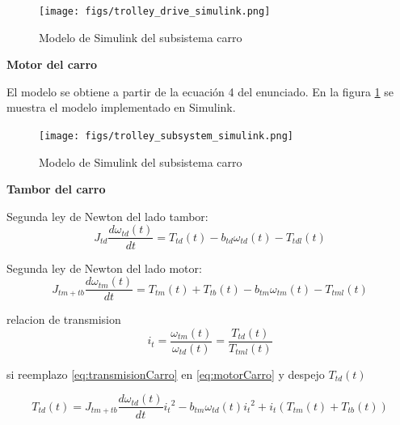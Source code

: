 \documentclass{article}
\begin{document}
            \begin{figure} [H]
                \centering
                \texttt{[image: figs/trolley\_drive\_simulink.png]}
                \caption{Modelo de Simulink del subsistema carro}
                \label{fig:trolley_drive_simulink}
            \end{figure}

            \textbf{Motor del carro}

            El modelo se obtiene a partir de la ecuación 4 del enunciado. En la figura \ref{fig:trolley_drive_simulink} se muestra el modelo implementado en Simulink.

            \begin{figure} [H]
                \centering
                \texttt{[image: figs/trolley\_subsystem\_simulink.png]}
                \caption{Modelo de Simulink del subsistema carro}
                \label{fig:trolley_subsystem_simulink}
            \end{figure}

            \textbf{Tambor del carro}

            Segunda ley de Newton del lado tambor:
            \begin{equation} \label{eq:tamborCarro}
                J_{td} \frac{d \omega_{td}(t)}{dt} = T_{td}(t) - b_{td} \omega_{td}(t) - T_{tdl}(t)
            \end{equation}

            Segunda ley de Newton del lado motor:
            \begin{equation} \label{eq:motorCarro}
                J_{tm+tb} \frac{d \omega_{tm}(t)}{dt} = T_{tm}(t) + T_{tb}(t) - b_{tm} \omega_{tm}(t) - T_{tml}(t)
            \end{equation}

            relacion de transmision
            \begin{equation} \label{eq:transmisionCarro}
                i_t = \frac{\omega_{tm}(t)}{\omega_{td}(t)} = \frac{T_{td}(t)}{T_{tml}(t)}
            \end{equation}

            si reemplazo \ref{eq:transmisionCarro} en \ref{eq:motorCarro} y despejo $T_{td}(t)$

            \begin{equation} \label{eq:Ttd}
                T_{td}(t) = J_{tm+tb} \frac{d \omega_{td}(t)}{dt} {i_t}^2 - b_{tm} \omega_{td}(t) {i_t}^2 + i_t (T_{tm}(t) + T_{tb}(t))
            \end{equation}
\end{document}
